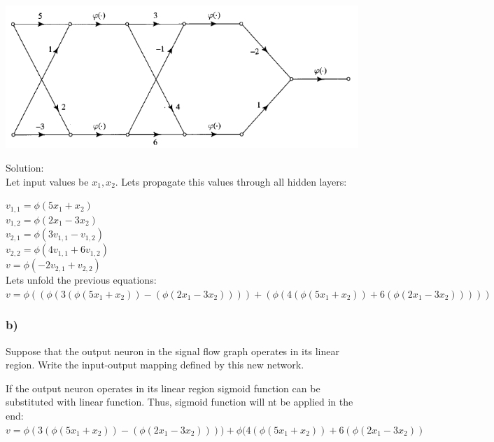 \documentclass[a4paper, 12pt]{article}
\begin{document}
\includegraphics[scale=0.7]{113.png}

Solution:\\

Let input values be $x_1,x_2$. Lets propagate this values through all hidden layers:

$v_{1,1} = \phi(5x_1+x_2)$ \\

$v_{1,2} = \phi(2x_1-3x_2)$ \\

$v_{2,1} = \phi(3v_{1,1}-v_{1,2})$ \\

$v_{2,2} = \phi(4v_{1,1}+6v_{1,2})$ \\

$v = \phi(-2v_{2,1}+v_{2,2})$ \\

Lets unfold the previous equations:
\\

$v = \phi((\phi(3(\phi(5x_1+x_2))-(\phi(2x_1-3x_2))))+(\phi(4(\phi(5x_1+x_2))+6(\phi(2x_1-3x_2)))))$

\subsubsection{b)}
Suppose that the output neuron in the signal flow graph operates in its linear region. Write the input-output mapping defined by this new network.

If the output neuron operates in its linear region sigmoid function can be substituted with linear function. Thus, sigmoid function will nt be applied in the end:
\\

$v = \phi(3(\phi(5x_1+x_2))-(\phi(2x_1-3x_2))))+\phi(4(\phi(5x_1+x_2))+6(\phi(2x_1-3x_2))$
\end{document}
